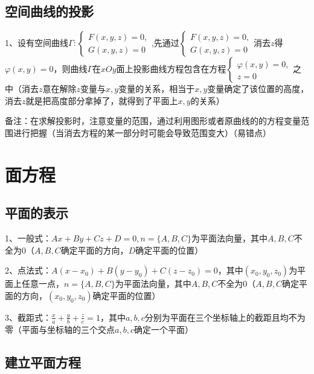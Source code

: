 \subsection{空间曲线的投影}

1、设有空间曲线$\Gamma:\left\{\begin{array}{l}F(x, y, z)=0, \\ G(x, y, z)=0\end{array}\right.$,先通过$\left\{\begin{array}{l}F(x, y, z)=0, \\ G(x, y, z)=0\end{array}\right.$消去$z$得$\varphi(x, y)=0$，则曲线$\Gamma$在$x O y$面上投影曲线方程包含在方程$\left\{\begin{array}{l}\varphi(x, y)=0, \\ z=0\end{array}\right.$之中（消去$z$意在解除$z$变量与$x,y$变量的关系，相当于$x,y$变量确定了该位置的高度，消去$z$就是把高度部分拿掉了，就得到了平面上$x,y$的关系）

备注：在求解投影时，注意变量的范围，通过利用图形或者原曲线的的方程变量范围进行把握（当消去方程的某一部分时可能会导致范围变大）（易错点）

\section{面方程}



\subsection{平面的表示}

1、一般式：$A x+B y+C z+D=0, n=\{A, B, C\}$为平面法向量，其中$A, B, C$不全为0（$A,B,C$确定平面的方向，$D$确定平面的位置）

2、点法式：$A\left(x-x_{0}\right)+B\left(y-y_{0}\right)+C\left(z-z_{0}\right)=0$，其中$\left(x_{0}, y_{0}, z_{0}\right)$为平面上任意一点，$n=\{A, B, C\}$为平面法向量，其中$A, B, C$不全为0（$A,B,C$确定平面的方向，$\left(x_{0}, y_{0}, z_{0}\right)$确定平面的位置）

3、截距式：$\frac{x}{a}+\frac{y}{b}+\frac{z}{c}=1$，其中$a, b, c$分别为平面在三个坐标轴上的截距且均不为零（平面与坐标轴的三个交点$a, b, c$确定一个平面）



\subsection{建立平面方程}

